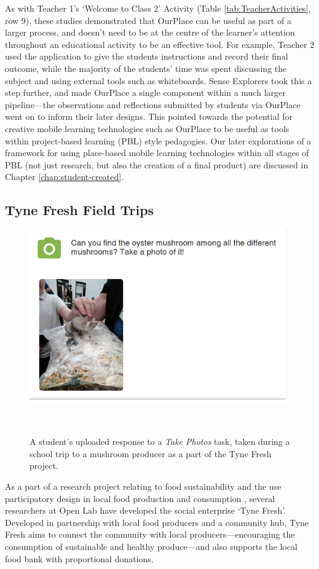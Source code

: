 As with Teacher 1's `Welcome to Class 2' Activity (Table \ref{tab:TeacherActivities}, row 9), these studies demonstrated that OurPlace can be useful as part of a larger process, and doesn't need to be at the centre of the learner's attention throughout an educational activity to be an effective tool. For example, Teacher 2 used the application to give the students instructions and record their final outcome, while the majority of the students' time was spent discussing the subject and using external tools such as whiteboards. Sense Explorers took this a step further, and made OurPlace a single component within a much larger pipeline---the observations and reflections submitted by students via OurPlace went on to inform their later designs. This pointed towards the potential for creative mobile learning technologies such as OurPlace to be useful as tools within project-based learning (PBL) style pedagogies. Our later explorations of a framework for using place-based mobile learning technologies within all stages of PBL (not just research, but also the creation of a final product) are discussed in Chapter \ref{chap:student-created}.

\subsection{Tyne Fresh Field Trips}
\label{sec:TyneFresh}

\begin{figure}
  \centering
  \includegraphics[width=0.7\columnwidth]{images/chapter07/mushroom.png}
  \caption[A student's uploaded photo from a visit to a mushroom producer]{A student's uploaded response to a \textit{Take Photos} task, taken during a school trip to a mushroom producer as a part of the Tyne Fresh project.}~\label{fig:MushroomTrip}
\end{figure}

As a part of a research project relating to food sustainability and the use participatory design in local food production and consumption \citep{Prost2019}, several researchers at Open Lab have developed the social enterprise `Tyne Fresh'. Developed in partnership with local food producers and a community hub, Tyne Fresh aims to connect the community with local producers---encouraging the consumption of sustainable and healthy produce---and also supports the local food bank with proportional donations.

